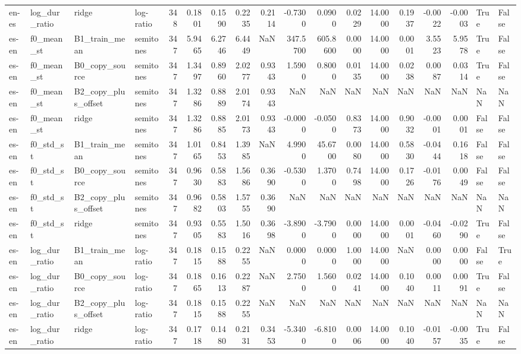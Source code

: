 \begin{tabular}{llllrrrrrrrrrrrrll}
en-es & log_dur_ratio & ridge & log-ratio & 348 & 0.1801 & 0.1590 & 0.2235 & 0.2114 & -0.7300 & 0.0900 & 0.0229 & 14.0000 & 0.1937 & -0.0022 & -0.0003 & True & False \\
es-en & f0_mean_st & B1_train_mean & semitones & 347 & 5.9465 & 6.2746 & 6.4449 & NaN & 347.5700 & 605.8600 & 0.0000 & 14.0000 & 0.0001 & 3.5523 & 5.9578 & True & False \\
es-en & f0_mean_st & B0_copy_source & semitones & 347 & 1.3497 & 0.8960 & 2.0277 & 0.9343 & 1.5900 & 0.8000 & 0.0135 & 14.0000 & 0.0238 & 0.0087 & 0.0314 & True & False \\
es-en & f0_mean_st & B2_copy_plus_offset & semitones & 347 & 1.3286 & 0.8889 & 2.0174 & 0.9343 & NaN & NaN & NaN & NaN & NaN & NaN & NaN & NaN & NaN \\
es-en & f0_mean_st & ridge & semitones & 347 & 1.3286 & 0.8885 & 2.0173 & 0.9343 & -0.0000 & -0.0500 & 0.8373 & 14.0000 & 0.9032 & -0.0001 & 0.0001 & False & False \\
es-en & f0_std_st & B1_train_mean & semitones & 347 & 1.0165 & 0.8453 & 1.3985 & NaN & 4.9900 & 45.6700 & 0.0080 & 14.0000 & 0.5830 & -0.0444 & 0.1618 & False & False \\
es-en & f0_std_st & B0_copy_source & semitones & 347 & 0.9630 & 0.5883 & 1.5686 & 0.3690 & -0.5300 & 1.3700 & 0.7498 & 14.0000 & 0.1726 & -0.0176 & 0.0049 & False & False \\
es-en & f0_std_st & B2_copy_plus_offset & semitones & 347 & 0.9682 & 0.5803 & 1.5755 & 0.3690 & NaN & NaN & NaN & NaN & NaN & NaN & NaN & NaN & NaN \\
es-en & f0_std_st & ridge & semitones & 347 & 0.9305 & 0.5583 & 1.5016 & 0.3698 & -3.8900 & -3.7900 & 0.0000 & 14.0000 & 0.0001 & -0.0460 & -0.0290 & True & False \\
es-en & log_dur_ratio & B1_train_mean & log-ratio & 347 & 0.1815 & 0.1588 & 0.2255 & NaN & 0.0000 & 0.0000 & 1.0000 & 14.0000 & NaN & 0.0000 & 0.0000 & False & True \\
es-en & log_dur_ratio & B0_copy_source & log-ratio & 347 & 0.1865 & 0.1613 & 0.2287 & NaN & 2.7500 & 1.5600 & 0.0241 & 14.0000 & 0.1040 & 0.0011 & 0.0091 & True & False \\
es-en & log_dur_ratio & B2_copy_plus_offset & log-ratio & 347 & 0.1815 & 0.1588 & 0.2255 & NaN & NaN & NaN & NaN & NaN & NaN & NaN & NaN & NaN & NaN \\
es-en & log_dur_ratio & ridge & log-ratio & 347 & 0.1718 & 0.1480 & 0.2131 & 0.3453 & -5.3400 & -6.8100 & 0.0006 & 14.0000 & 0.1040 & -0.0157 & -0.0035 & True & False \\
\bottomrule
\end{tabular}
